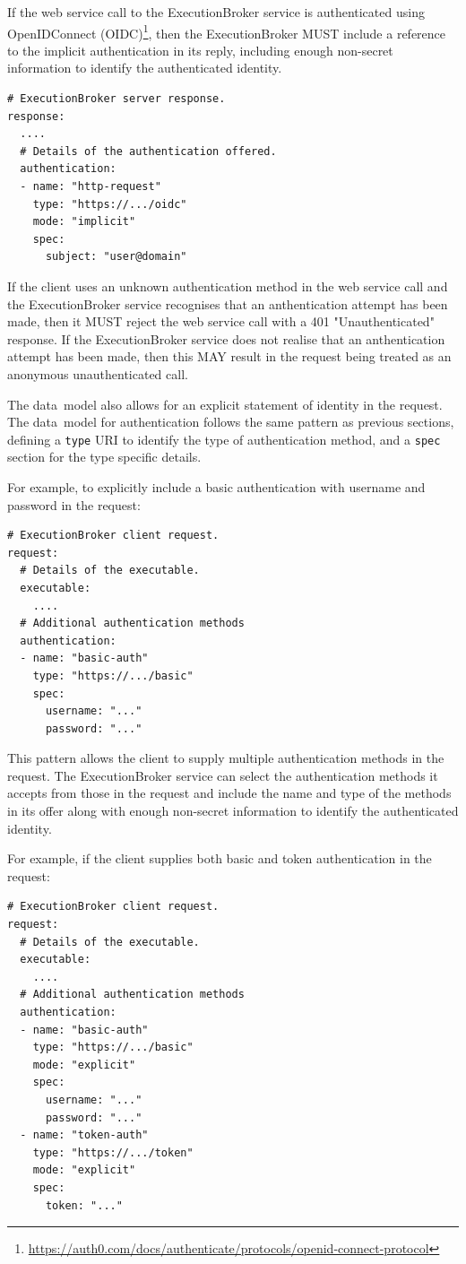 \documentclass[11pt,a4paper]{ivoa}
\newcommand{\datamodel} {data~model}
\newcommand{\webservice} {web service}
\newcommand{\execbrokerclass} {ExecutionBroker}
\newcommand{\codeword}[1] {\texttt{#1}}
\newcommand{\footurl}[1] {\footnote{\url{#1}}}
\begin{document}
If the \webservice{} call to the \execbrokerclass{} service is authenticated
using OpenIDConnect
(OIDC)\footurl{https://auth0.com/docs/authenticate/protocols/openid-connect-protocol},
then the \execbrokerclass{} MUST include a reference to the implicit
authentication in its reply, including enough non-secret
information to identify the authenticated identity.

\begin{lstlisting}[]
# ExecutionBroker server response.
response:
  ....
  # Details of the authentication offered.
  authentication:
  - name: "http-request"
    type: "https://.../oidc"
    mode: "implicit"
    spec:
      subject: "user@domain"
\end{lstlisting}

If the client uses an unknown authentication method in the \webservice{} call and
the \execbrokerclass{} service recognises that an anthentication attempt has been made,
then it MUST reject the \webservice{} call with a 401 "Unauthenticated" response.
If the \execbrokerclass{} service does not realise that an anthentication attempt has been made,
then this MAY result in the request being treated as an anonymous unauthenticated call.

The \datamodel{} also allows for an explicit statement of identity in the request.
The \datamodel{} for authentication follows the same pattern as previous sections,
defining a \codeword{type} URI to identify the type of authentication method,
and a \codeword{spec} section for the type specific details.

For example, to explicitly include a basic authentication with username and password
in the request:
\begin{lstlisting}[]
# ExecutionBroker client request.
request:
  # Details of the executable.
  executable:
    ....
  # Additional authentication methods
  authentication:
  - name: "basic-auth"
    type: "https://.../basic"
    spec:
      username: "..."
      password: "..."
\end{lstlisting}

This pattern allows the client to supply multiple authentication methods
in the request. The \execbrokerclass{} service can select the authentication
methods it accepts from those in the request and include the name and
type of the methods in its offer along with enough non-secret
information to identify the authenticated identity.

For example, if the client supplies both basic and token authentication
in the request:
\begin{lstlisting}[]
# ExecutionBroker client request.
request:
  # Details of the executable.
  executable:
    ....
  # Additional authentication methods
  authentication:
  - name: "basic-auth"
    type: "https://.../basic"
    mode: "explicit"
    spec:
      username: "..."
      password: "..."
  - name: "token-auth"
    type: "https://.../token"
    mode: "explicit"
    spec:
      token: "..."
\end{lstlisting}
\end{document}
